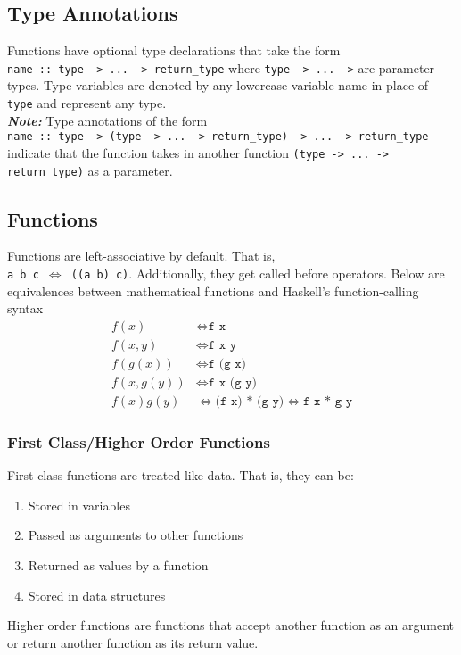 \documentclass{article}
\begin{document}
\subsection{Type Annotations} Functions have optional
type declarations that take the form \\
\texttt{name :: type -> ... -> return\_type} where \texttt{type ->
  ... ->} are parameter types. Type variables are denoted by any
lowercase variable name in place of \texttt{type} and represent any
type. \\
\textit{\textbf{Note:}} Type annotations of the form \\
\texttt{name :: type -> (type -> ... -> return\_type) -> ... ->
  return\_type} indicate that the function takes in another function
\texttt{(type -> ... -> return\_type)} as a parameter.





\subsection{Functions}
Functions are left-associative by default. That is, \\
\texttt{a b c $\iff$ ((a b) c)}. Additionally, they get called before
operators. Below are equivalences between mathematical functions and
Haskell's function-calling syntax
\begin{align*}
  f(x) &\iff \texttt{f x} \\
  f(x, y) &\iff \texttt{f x y} \\
  f(g(x)) &\iff \texttt{f (g x)} \\
  f(x, g(y)) &\iff \texttt{f x (g y)} \\
  f(x)g(y) &\iff \texttt{(f x) * (g y)} \iff \texttt{f x * g y}
\end{align*}





\subsubsection{First Class/Higher Order Functions}
First class functions are treated like data. That is, they can be:
\begin{enumerate}[label=(\roman*),align=left]
\item Stored in variables
\item Passed as arguments to other functions
\item Returned as values by a function
\item Stored in data structures
\end{enumerate}
Higher order functions are functions that accept another function as
an argument or return another function as its return value.
\end{document}
